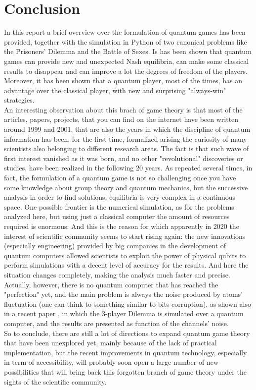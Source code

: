 \hfill

\section{Conclusion}
In this report a brief overview over the formulation of quantum games has been provided, together with the simulation in Python of two canonical problems like the Prisoners' Dilemma and the Battle of Sexes. Is has been shown that quantum games can provide new and unexpected Nash equilibria, can make some classical results to disappear and can improve a lot the degrees of freedom of the players. Moreover, it has been shown that a quantum player, most of the times, has an advantage over the classical player, with new and surprising "always-win" strategies.\\	
An interesting observation about this brach of game theory is that most of the articles, papers, projects, that you can find on the internet have been written around 1999 and 2001, that are also the years in which the discipline of quantum information has been, for the first time, formalized arising the curiosity of many scientists also belonging to different research areas. The fact is that such wave of first interest vanished as it was born, and no other "revolutional" discoveries or studies, have been realized in the following 20 years. As repeated several times, in fact, the formulation of a quantum game is not so challenging once you have some knowledge about group theory and quantum mechanics, but the successive analysis in order to find solutions, equilibria is very complex in a continuous space. One possible frontier is the numerical simulation, as for the problems analyzed here, but using just a classical computer the amount of resources required is enormous. And this is the reason for which apparently in 2020 the interest of scientific community seems to start rising again: the new innovations (especially engineering) provided by big companies in the development of quantum computers allowed scientists to exploit the power of physical qubits to perform simulations with a decent level of accuracy for the results. And here the situation changes completely, making the analysis much faster and precise. Actually, however, there is no quantum computer that has reached the "perfection" yet, and the main problem is always the noise produced by atoms' fluctuation (one can think to something similar to bits corruption), as shown also in a recent paper \cite{kairon2020noisy}, in which the 3-player Dilemma is simulated over a quantum computer, and the results are presented as function of the channels' noise.\\
So to conclude, there are still a lot of directions to expand quantum game theory that have been unexplored yet, mainly because of the lack of practical implementation, but the recent improvements in quantum technology, especially in term of accessibility, will probably soon open a large number of new possibilities that will bring back this forgotten branch of game theory under the sights of the scientific community.